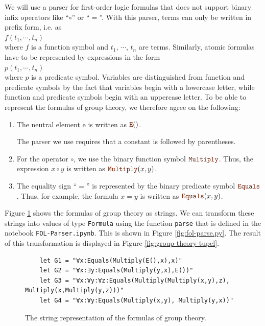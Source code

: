 We will use a parser for first-order logic formulas that does not support binary infix operators like
``$\circ$'' or ``$=$''. With this parser, terms can only be written in prefix form, i.e. as
\\[0.2cm]
\hspace*{1.3cm}
$f(t_1,\cdots,t_n)$
\\[0.2cm]
where $f$ is a function symbol and $t_1$, $\cdots$, $t_n$ are terms. Similarly, atomic formulas have to be
represented by expressions in the form 
\\[0.2cm]
\hspace*{1.3cm}
$p(t_1,\cdots,t_n)$
\\[0.2cm]
where $p$ is a predicate symbol.  Variables are distinguished from function and predicate symbols
by the fact that variables begin with a lowercase letter, while function and
predicate symbols begin with an uppercase letter. To be able to represent the formulas of group theory, we
therefore agree on the following: 
\begin{enumerate}
\item The neutral element $\mathrm{e}$ is written as $\mytt{E}()$.

      The parser we use requires that  a constant is followed by parentheses.
\item For the operator $\circ$, we use the binary function symbol $\mytt{Multiply}$.
      Thus, the expression $x \circ y$ is written as $\mytt{Multiply}(x, y)$.
\item The equality sign ``$=$'' is represented by the binary predicate symbol
      $\mytt{Equals}$. Thus, for example, the formula $x = y$ is written as $\mytt{Equals}(x, y)$.
\end{enumerate}
Figure \ref{fig:group-theory} shows the formulas of group theory as strings.
We can transform these strings into values of type \texttt{Formula} using the function \texttt{parse} that is
defined in the notebook \texttt{FOL-Parser.ipynb}.  This is shown in Figure \ref{fig:fol-parse.py}.  The result
of this transformation is displayed in Figure \ref{fig:group-theory-tupel}. 


\begin{figure}[!ht]
\centering
\begin{verbatim}
    let G1 = "∀x:Equals(Multiply(E(),x),x)"
    let G2 = "∀x:∃y:Equals(Multiply(y,x),E())"
    let G3 = "∀x:∀y:∀z:Equals(Multiply(Multiply(x,y),z), Multiply(x,Multiply(y,z)))"
    let G4 = "∀x:∀y:Equals(Multiply(x,y), Multiply(y,x))"
\end{verbatim}
\vspace*{-0.3cm}
\caption{The string representation of the formulas of group theory.}
\label{fig:group-theory}
\end{figure}


